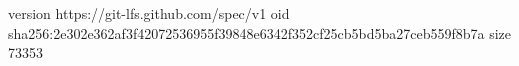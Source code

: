 version https://git-lfs.github.com/spec/v1
oid sha256:2e302e362af3f42072536955f39848e6342f352cf25cb5bd5ba27ceb559f8b7a
size 73353
